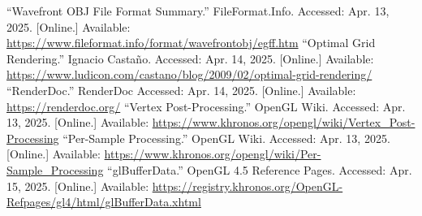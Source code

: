 \documentclass[12pt, a4paper]{article}
\begin{document}
\begin{thebibliography}{9}
        ``Wavefront OBJ File Format Summary.'' FileFormat.Info. Accessed: Apr. 13, 2025. [Online.]
        Available: \url{https://www.fileformat.info/format/wavefrontobj/egff.htm}
        ``Optimal Grid Rendering.'' Ignacio Castaño. Accessed: Apr. 14, 2025. [Online.] Available:
        \url{https://www.ludicon.com/castano/blog/2009/02/optimal-grid-rendering/}
        ``RenderDoc.'' RenderDoc Accessed: Apr. 14, 2025. [Online.] Available:
        \url{https://renderdoc.org/}
        ``Vertex Post-Processing.'' OpenGL Wiki. Accessed: Apr. 13, 2025. [Online.] Available:
        \url{https://www.khronos.org/opengl/wiki/Vertex_Post-Processing}
        ``Per-Sample Processing.'' OpenGL Wiki. Accessed: Apr. 13, 2025. [Online.] Available:
        \url{https://www.khronos.org/opengl/wiki/Per-Sample_Processing}
        ``glBufferData.'' OpenGL 4.5 Reference Pages. Accessed: Apr. 15, 2025. [Online.] Available:
        \url{https://registry.khronos.org/OpenGL-Refpages/gl4/html/glBufferData.xhtml}
\end{thebibliography}
\endgroup
\end{document}

